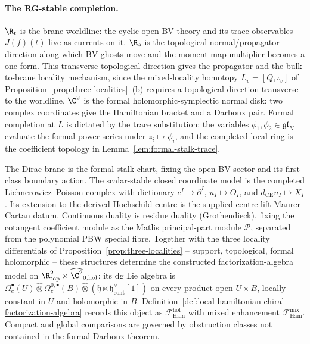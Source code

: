 \documentclass[11pt]{memoir}
\begin{document}
\paragraph{The RG-stable completion.}
\(\R_t\) is the brane worldline: the cyclic open BV theory and its
trace observables \(J(f)(t)\) live as currents on it.  \(\R_s\) is the
topological normal/propagator direction along which BV ghosts move
and the moment-map multiplier becomes a one-form.  This transverse
topological direction gives the propagator and the bulk-to-brane
locality mechanism, since the mixed-locality
homotopy \(L_v=[Q,\iota_v]\) of
Proposition~\ref{prop:three-localities}~(b) requires a topological
direction transverse to the worldline.  \(\C^2\) is the formal
holomorphic-symplectic normal disk: two complex coordinates give
the Hamiltonian bracket and a Darboux pair.
Formal completion at \(L\) is dictated by the trace substitution:
the variables \(\phi_1,\phi_2\in\mathfrak{gl}_N\) evaluate the formal
power series under \(z_i\mapsto\phi_i\), and the completed local ring is
the coefficient topology in Lemma~\ref{lem:formal-stalk-trace}.

The Dirac brane is the formal-stalk chart, fixing the open BV
sector and its first-class boundary action.  The scalar-stable closed
coordinate model is the completed Lichnerowicz--Poisson complex with
dictionary
\(c^I\mapsto\partial^I\), \(u_I\mapsto O_I\), and
\(d_{\mathrm{CE}}u_I\mapsto X_I\).  Its extension to the derived
Hochschild centre is the supplied centre-lift Maurer--Cartan datum.
Continuous duality is
residue duality (Grothendieck), fixing the cotangent coefficient
module as the Matlis principal-part module \(\mathcal P\), separated
from the polynomial PBW special fibre.  Together with the
three locality differentials
of Proposition~\ref{prop:three-localities} -- support, topological,
formal holomorphic -- these structures determine the constructed
factorization-algebra model on
\(\R^2_{\mathrm{top}}\times\widehat{\C^2}_{0,\mathrm{hol}}\):
its dg Lie algebra is
\(\Omega_c^\bullet(U)\widehat\otimes\Omega_c^{0,\bullet}(B)
\widehat\otimes(\mathfrak h\ltimes\mathfrak h^\vee_{\mathrm{cont}}[1])\)
on every product open \(U\times B\), locally constant in \(U\) and
holomorphic in \(B\).  Definition~\ref{def:local-hamiltonian-chiral-factorization-algebra}
records this object as \(\mathcal F^{\mathrm{hol}}_{\mathrm{Ham}}\)
with mixed enhancement \(\mathcal F^{\mathrm{mix}}_{\mathrm{Ham}}\).
Compact and global comparisons are governed by obstruction classes not
contained in the formal-Darboux theorem.
\end{document}
